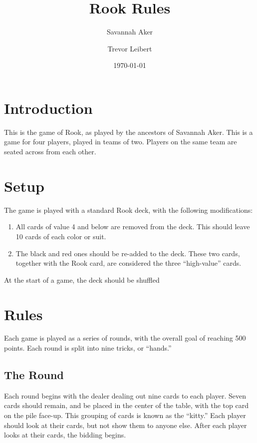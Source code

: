 \documentclass[10pt]{article}
\begin{document}
\title{Rook Rules}
\author{Savannah Aker
    \and
    Trevor Leibert}
\date{\today}

\maketitle
\pagebreak

\section{Introduction}

This is the game of Rook, as played by the ancestors of Savannah Aker.
This is a game for four players, played in teams of two.
Players on the same team are seated across from each other.

\section{Setup}

The game is played with a standard Rook deck, with the following modifications:

\begin{enumerate}
    \item All cards of value 4 and below are removed from the deck.
          This should leave 10 cards of each color or suit.
    \item The black and red ones should be re-added to the deck.
          These two cards, together with the Rook card, are considered the three ``high-value'' cards.
\end{enumerate}

At the start of a game, the deck should be shuffled

\section{Rules}

Each game is played as a series of rounds, with the overall goal of reaching 500 points.
Each round is split into nine tricks, or ``hands.''

\subsection{The Round}

Each round begins with the dealer dealing out nine cards to each player.
Seven cards should remain, and be placed in the center of the table, with the top card on the pile face-up.
This grouping of cards is known as the ``kitty.''
Each player should look at their cards, but not show them to anyone else.
After each player looks at their cards, the bidding begins.
\end{document}
